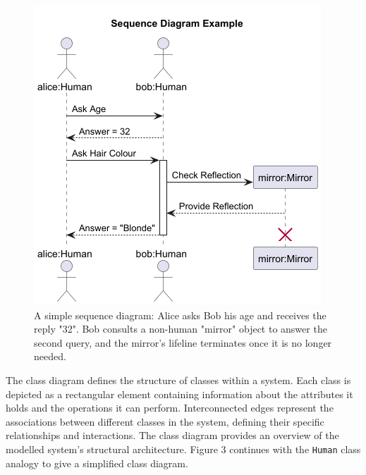 \documentclass{article}
\newcounter{subsubsubsection}[subsubsection]
\begin{document}
{\begin{figure}[H]
    \centering
\includegraphics[width=0.7\linewidth]{SDexample-Sequence_Diagram_Example.png}
    \caption{A simple sequence diagram: Alice asks Bob his age and receives the reply "32". Bob consults a non-human "mirror" object to answer the second query, and the mirror's lifeline terminates once it is no longer needed.}
    \label{fig:Simple SD}
\end{figure}


The class diagram defines the structure of classes within a system\cite{Seidl_Scholz_Huemer_Kappel_Duffy_2014}. Each class is depicted as a rectangular element containing information about the attributes it holds and the operations it can perform. Interconnected edges represent the associations between different classes in the system, defining their specific relationships and interactions. The class diagram provides an overview of the modelled system's structural architecture. Figure 3 continues with the \texttt{Human} class analogy to give a simplified class diagram.

}
\end{document}
